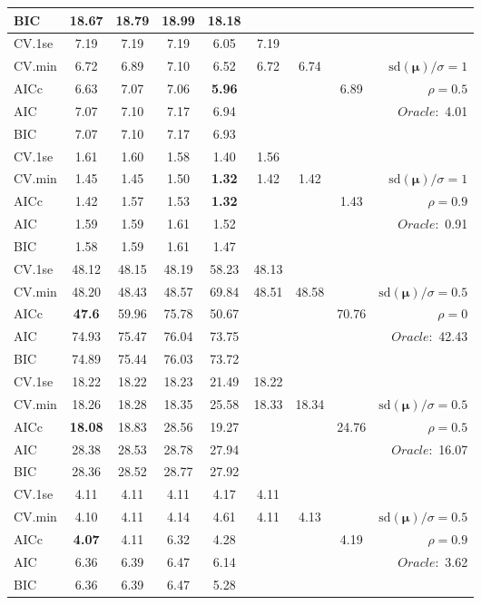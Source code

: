 \begin{table}
\begin{center}
\begin{tabular}{l*{7}{c}|r}
BIC & 18.67 & 18.79 & 18.99 & 18.18 & & & &  \\
 \hline 
CV.1se & 7.19 & 7.19 & 7.19 & 6.05 & 7.19 & & & \\
CV.min & 6.72 & 6.89 & 7.10 & 6.52 & 6.72 & 6.74 & & $\mathrm{sd}(\mathbf{\mu})/\sigma=1$ \\
AICc & 6.63 & 7.07 & 7.06 & {\bf 5.96} & & & 6.89 &  $\rho=0.5$ \\
AIC & 7.07 & 7.10 & 7.17 & 6.94 & & & &  \multirow{2}{*}{$Oracle: $ 4.01} \\
BIC & 7.07 & 7.10 & 7.17 & 6.93 & & & &  \\
 \hline 
CV.1se & 1.61 & 1.60 & 1.58 & 1.40 & 1.56 & & & \\
CV.min & 1.45 & 1.45 & 1.50 & {\bf 1.32} & 1.42 & 1.42 & & $\mathrm{sd}(\mathbf{\mu})/\sigma=1$ \\
AICc & 1.42 & 1.57 & 1.53 & {\bf 1.32} & & & 1.43 &  $\rho=0.9$ \\
AIC & 1.59 & 1.59 & 1.61 & 1.52 & & & &  \multirow{2}{*}{$Oracle: $ 0.91} \\
BIC & 1.58 & 1.59 & 1.61 & 1.47 & & & &  \\
 \hline 
CV.1se & 48.12 & 48.15 & 48.19 & 58.23 & 48.13 & & & \\
CV.min & 48.20 & 48.43 & 48.57 & 69.84 & 48.51 & 48.58 & & $\mathrm{sd}(\mathbf{\mu})/\sigma=0.5$ \\
AICc & {\bf 47.6} & 59.96 & 75.78 & 50.67 & & & 70.76 &  $\rho=0$ \\
AIC & 74.93 & 75.47 & 76.04 & 73.75 & & & &  \multirow{2}{*}{$Oracle: $ 42.43} \\
BIC & 74.89 & 75.44 & 76.03 & 73.72 & & & &  \\
 \hline 
CV.1se & 18.22 & 18.22 & 18.23 & 21.49 & 18.22 & & & \\
CV.min & 18.26 & 18.28 & 18.35 & 25.58 & 18.33 & 18.34 & & $\mathrm{sd}(\mathbf{\mu})/\sigma=0.5$ \\
AICc & {\bf 18.08} & 18.83 & 28.56 & 19.27 & & & 24.76 &  $\rho=0.5$ \\
AIC & 28.38 & 28.53 & 28.78 & 27.94 & & & &  \multirow{2}{*}{$Oracle: $ 16.07} \\
BIC & 28.36 & 28.52 & 28.77 & 27.92 & & & &  \\
 \hline 
CV.1se & 4.11 & 4.11 & 4.11 & 4.17 & 4.11 & & & \\
CV.min & 4.10 & 4.11 & 4.14 & 4.61 & 4.11 & 4.13 & & $\mathrm{sd}(\mathbf{\mu})/\sigma=0.5$ \\
AICc & {\bf 4.07} & 4.11 & 6.32 & 4.28 & & & 4.19 &  $\rho=0.9$ \\
AIC & 6.36 & 6.39 & 6.47 & 6.14 & & & &  \multirow{2}{*}{$Oracle: $ 3.62} \\
BIC & 6.36 & 6.39 & 6.47 & 5.28 & & & &  \\
 \hline 
\end{tabular}
\end{center}
\vspace{-1cm}
\end{table}





